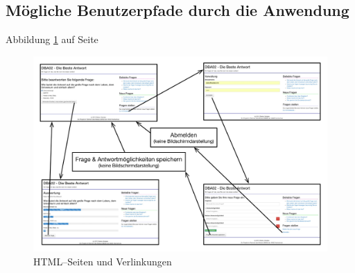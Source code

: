 \subsection{Mögliche Benutzerpfade durch die Anwendung}

Abbildung \ref{fig:zustaende} auf Seite \pageref{fig:zustaende}

\begin{figure}[h]
\begin{center}
\includegraphics[width=\textwidth]{zustaende.jpg}
\caption{HTML--Seiten und Verlinkungen}
\end{center}
\label{fig:zustaende}
\end{figure}

